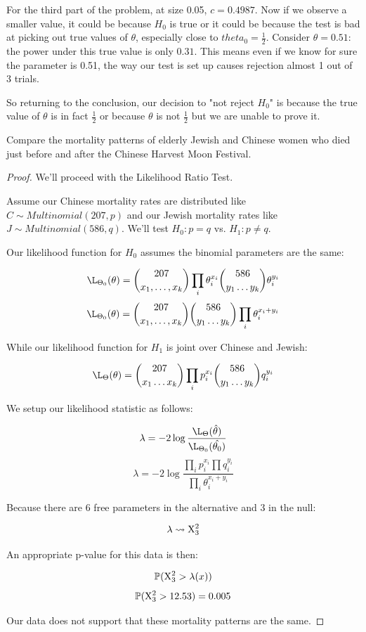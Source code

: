 \documentclass[10pt]{article}
\begin{document}
\begin{note}
For the third part of the problem, at size 0.05, $c=0.4987$. Now if we observe
a smaller value, it could be because $H_0$ is true or it could be because the
test is bad at picking out true values of $\theta$, especially close to
$theta_0=\frac{1}{2}$. Consider $\theta=0.51$: the power under this true value
is only $0.31$. This means even if we know for sure the parameter is 0.51, the
way our test is set up causes rejection almost 1 out of 3 trials.

So returning to the conclusion, our decision to "not reject $H_0$" is because
the true value of $\theta$ is in fact $\frac{1}{2}$ or because $\theta$ is not
$\frac{1}{2}$ but we are unable to prove it.
\end{note}


\setcounter{exercise}{9}
\begin{exercise}
    Compare the mortality patterns of elderly Jewish and Chinese women who died
    just before and after the Chinese Harvest Moon Festival.
\end{exercise}

\begin{proof}
    We'll proceed with the Likelihood Ratio Test.

    Assume our Chinese mortality rates are distributed like $C \sim
    Multinomial(207, p)$ and our Jewish mortality rates like $J \sim
    Multinomial(586, q)$. We'll test $H_0: p = q$ vs. $H_1: p \neq q$.

    Our likelihood function for $H_0$ assumes the binomial parameters are the same:

    \[ \L_{\Theta_0}(\theta) = \binom{207}{x_1,\ldots,x_k}\prod_i \theta_i^{x_i} \binom{586}{y_1 \dots y_k} \theta_i^{y_i}\]
    \[ \L_{\Theta_0}(\theta) = \binom{207}{x_1,\ldots,x_k}\binom{586}{y_1 \dots y_k}\prod_i \theta_i^{x_i+y_i} \]

    While our likelihood function for $H_1$ is joint over Chinese and Jewish:

    \[ \L_{\Theta}(\theta) = \binom{207}{x_1 \dots x_k}\prod_i p_i^{x_i} \binom{586}{y_1 \dots y_k} q_i^{y_i}\]

    We setup our likelihood statistic as follows:

    \[ \lambda = -2\log\frac{\L_{\Theta}(\hat{\theta})}{\L_{\Theta_0}(\hat{\theta_0})} \]
    \[ \lambda = -2\log\frac{\prod_i p_i^{x_i} \prod q_i^{y_i}}{\prod_i \theta_i^{x_i + y_i}} \]

    Because there are 6 free parameters in the alternative and 3 in the null: 

    \[ \lambda \rightsquigarrow \mathrm{X}^2_{3}\]

    An appropriate p-value for this data is then:

    \[\mathbb{P}(\mathrm{X}^2_{3} > \lambda(x))\]
    \[\mathbb{P}(\mathrm{X}^2_{3} > 12.53) = 0.005\]

    Our data does not support that these mortality patterns are the same.
\end{proof}
\end{document}
